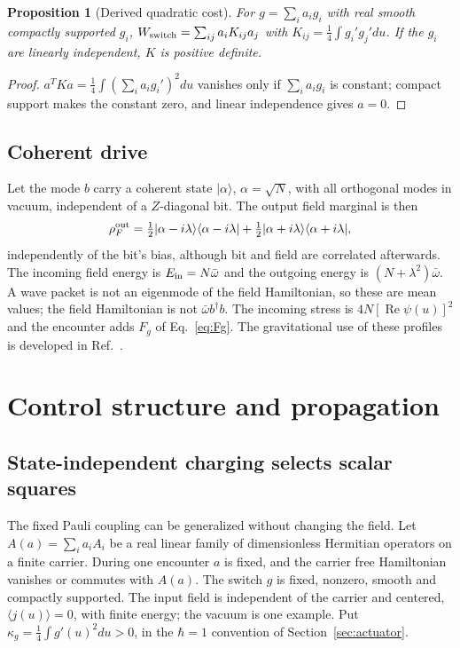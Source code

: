 \documentclass[aps,pre,onecolumn,superscriptaddress,floatfix,longbibliography]{revtex4-2}
\newtheorem{proposition}[theorem]{Proposition}
\begin{document}
\begin{proposition}[Derived quadratic cost]
\label{prop:K}
For $g=\sum_ia_ig_i$ with real smooth compactly supported $g_i$, $W_{\rm switch}=\sum_{ij}a_iK_{ij}a_j$ with $K_{ij}=\tfrac14\int g_i'g_j'du$. If the $g_i$ are linearly independent, $K$ is positive definite.
\end{proposition}

\begin{proof}
$a^TKa=\tfrac14\int(\sum_ia_ig_i')^2du$ vanishes only if $\sum_ia_ig_i$ is constant; compact support makes the constant zero, and linear independence gives $a=0$.
\end{proof}

\subsection{Coherent drive}

Let the mode $b$ carry a coherent state $|\alpha\rangle$, $\alpha=\sqrt N$, with all orthogonal modes in vacuum, independent of a $Z$-diagonal bit. The output field marginal is then
\begin{equation}
\rho_F^{\rm out}=\tfrac12|\alpha-i\lambda\rangle\langle\alpha-i\lambda|+\tfrac12|\alpha+i\lambda\rangle\langle\alpha+i\lambda|,
\end{equation}
independently of the bit's bias, although bit and field are correlated afterwards. The incoming field energy is $E_{\rm in}=N\bar\omega$ and the outgoing energy is $(N+\lambda^2)\bar\omega$. A wave packet is not an eigenmode of the field Hamiltonian, so these are mean values; the field Hamiltonian is not $\bar\omega b^\dagger b$. The incoming stress is $4N[\operatorname{Re}\psi(u)]^2$ and the encounter adds $F_g$ of Eq.~\eqref{eq:Fg}. The gravitational use of these profiles is developed in Ref.~\cite{Liu2026HAFFD}.

\section{Control structure and propagation}
\label{sec:forms}

\subsection{State-independent charging selects scalar squares}

The fixed Pauli coupling can be generalized without changing the field.
Let $A(a)=\sum_i a_iA_i$ be a real linear family of dimensionless Hermitian
operators on a finite carrier. During one encounter $a$ is fixed, and the
carrier free Hamiltonian vanishes or commutes with $A(a)$. The switch $g$
is fixed, nonzero, smooth and compactly supported. The input field is
independent of the carrier and centered, $\langle j(u)\rangle=0$, with
finite energy; the vacuum is one example. Put
$\kappa_g=\tfrac14\int g'(u)^2du>0$, in the $\hbar=1$ convention of
Section~\ref{sec:actuator}.
\end{document}
